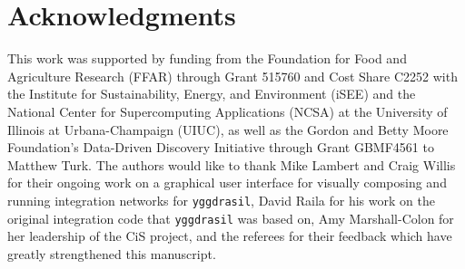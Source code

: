 \documentclass[journal]{IEEEtran}
\newcommand{\pkg}{{\tt yggdrasil}{}}
\begin{document}
\section*{Acknowledgments}
\ifieee
\else
\acknowledgments
\fi
%
This work was supported by funding from the Foundation for Food and Agriculture Research (FFAR) through Grant 515760 and Cost Share C2252 with the Institute for Sustainability, Energy, and Environment (iSEE) and the National Center for Supercomputing Applications (NCSA) at the University of Illinois at Urbana-Champaign (UIUC), as well as the Gordon and Betty Moore Foundation's Data-Driven Discovery Initiative through Grant GBMF4561 to Matthew Turk. 
%
The authors would like to thank Mike Lambert and Craig Willis for their ongoing work on a graphical user interface for visually composing and running integration networks for {\pkg}, David Raila for his work on the original integration code that {\pkg} was based on, Amy Marshall-Colon for her leadership of the CiS project, and the referees for their feedback which have greatly strengthened this manuscript.

\ifdraft
	
\else
	
\fi

\end{document}
